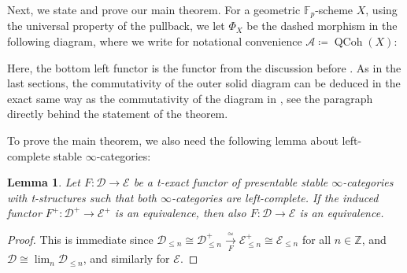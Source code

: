 \documentclass{article}
\theoremstyle{definition}
\theoremstyle{definition}
\theoremstyle{definition}
\theoremstyle{plain}
\newtheorem{lem}[defn]{Lemma}
\theoremstyle{plain}
\theoremstyle{plain}
\theoremstyle{plain}
\theoremstyle{plain}
\theoremstyle{plain}
\theoremstyle{plain}
\theoremstyle{plain}
\theoremstyle{remark}
\theoremstyle{remark}
\theoremstyle{plain}
\theoremstyle{plain}
\theoremstyle{plain}
\theoremstyle{plain}
\theoremstyle{plain}
\newcommand{\Z}{\mathbb{Z}}
\newcommand{\Fp}{\mathbb{F}_p}
\newcommand{\id}[1]{\operatorname{id}_{#1}}
\newcommand{\cartsymb}{\arrow[dr, phantom,"\scalebox{1.5}{\color{black}$\lrcorner$}", near start, color=black]}
\renewcommand{\lim}{\operatorname{lim}}
\newcommand{\QCoh}[1]{\operatorname{QCoh}(#1)}
\newcommand{\Frob}[2]{\operatorname{Frob}(#1, #2)}
\newcommand{\Cat}[1]{\mathcal{#1}}
\newcommand{\Fun}[2]{\operatorname{Fun}({#1},{#2})}
\begin{document}
Next, we state and prove our main theorem. For a geometric $\Fp$-scheme $X$, using the universal property of the pullback,
we let $\Phi_X$ be the dashed morphism in the following diagram, where we write for notational convenience $\Cat A \coloneqq \QCoh{X}$: 
\begin{center}
\end{center}
Here, the bottom left functor is the functor from the discussion before \cite[Theorem 5.1]{cartmod}.
As in the last sections, the commutativity of the outer solid diagram can be deduced in the exact same way 
as the commutativity of the diagram in \cite[Theorem 5.1]{cartmod}, see the paragraph directly behind the statement of the theorem.

To prove the main theorem, we also need the following lemma about left-complete stable $\infty$-categories:

\begin{lem} \label{lem:ab4:plus-equivalence}
    Let $F \colon \Cat D \to \Cat E$ be a t-exact functor 
    of presentable stable $\infty$-categories with t-structures such that both $\infty$-categories are left-complete.
    If the induced functor $F^+ \colon \Cat D^+ \to \Cat E^+$ is an equivalence,
    then also $F \colon \Cat D \to \Cat E$ is an equivalence.
\end{lem}
\begin{proof}
    This is immediate since $\Cat D_{\le n} \cong \Cat D^+_{\le n} \xrightarrow[F]{\simeq} \Cat E^+_{\le n} \cong \Cat E_{\le n}$ for all $n \in \Z$,
    and $\Cat D \cong \lim_n \Cat D_{\le n}$, and similarly for $\Cat E$.
\end{proof}
\end{document}
